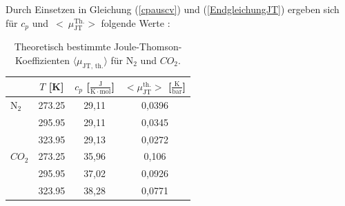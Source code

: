 \documentclass[a4paper,12pt,oneside,onecolum,final,openany]{report}
\begin{document}
Durch Einsetzen in Gleichung (\ref{cpauscv}) und (\ref{EndgleichungJT}) ergeben sich für $c_p$ und~$<~\mu_{\text{JT}}^{\text{Th.}}>$ folgende Werte :\\

\begin{table} [h]
\centering
\caption{Theoretisch bestimmte Joule-Thomson-Koeffizienten $\langle \mu_{\text{JT, th.}} \rangle$ für $\text{N}_2$  und $CO_2$.}
\begin{tabular} {l | c|  c | c}
	 &  $T$ [K] &  $c_p$ [$\frac{\mathrm{J}}{\mathrm{K}\cdot \mathrm{mol}}$] & $ <\mu_{\text{JT}}^{\text{th.}}>$ [$\frac{\mathrm{K}}{\mathrm{bar}}$] \\
	 \hline
	  $\text{N}_\mathrm{2}$ & 273.25 & 29,11 & 0,0396\\
	   & 295.95 & 29,11 & 0,0345\\
	  & 323.95 & 29,13 & 0,0272 \\
	\hline
	$CO_2$ & 273.25& 35,96&0,106  \\
	& 295.95 & 37,02& 0,0926\\
	& 323.95& 38,28& 0,0771\\
\end{tabular}
\end{table}
\FloatBarrier
\end{document}
